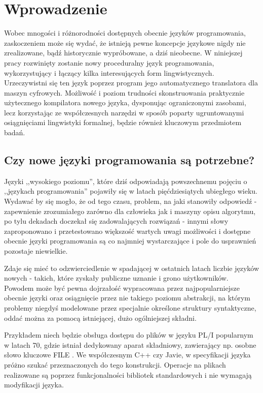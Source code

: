\chapter{Wprowadzenie}
\label{cha:wstep}

Wobec mnogości i różnorodności dostępnych obecnie języków programowania, zaskoczeniem może się wydać, że istnieją pewne koncepcje językowe nigdy nie zrealizowane, bądź historycznie wypróbowane, a dziś nieobecne. W niniejszej pracy rozwinięty zostanie nowy proceduralny język programowania, wykorzystujący i łączący kilka interesujących form lingwistycznych.
Urzeczywistni się ten język poprzez program jego automatycznego translatora dla maszyn cyfrowych. Możliwość i poziom trudności skonstruowania praktycznie użytecznego kompilatora nowego języka, dysponując ograniczonymi zasobami, lecz korzystając ze współczesnych narzędzi w sposób poparty ugruntowanymi osiągnięciami lingwistyki formalnej, będzie również kluczowym przedmiotem badań.


\section{Czy nowe języki programowania są potrzebne?}
Języki ,,wysokiego poziomu'', które dziś odpowiadają powszechnemu pojęciu o ,,językach programowania'' pojawiły się w latach pięćdziesiątych ubiegłego wieku.\cite[s.~13]{DRAGON_BOOK} Wydawać by się mogło, że od tego czasu, problem, na jaki stanowiły odpowiedź - zapewnienie zrozumiałego zarówno dla człowieka jak i maszyny opisu algorytmu, po tylu dekadach doczekał się zadowalających rozwiązań - innymi słowy zaproponowano i przetestowano większość wartych uwagi możliwości i dostępne obecnie języki programowania są co najmniej wystarczające i pole do usprawnień pozostaje niewielkie.

Zdaje się mieć to odzwierciedlenie w spadającej w ostatnich latach liczbie języków nowych - takich, które zyskały publiczne uznanie i grono użytkowników.\cite{valverde2015} Powodem może być pewna dojrzałość wypracowana przez najpopularniejsze obecnie języki oraz osiągnięcie przez nie takiego poziomu abstrakcji, na którym problemy niegdyś modelowane przez specjalnie określone struktury syntaktyczne, oddać można za pomocą istniejącej, dużo ogólniejszej składni.

Przykładem niech będzie obsługa dostępu do plików w języku PL/I popularnym w latach 70, gdzie istniał dedykowany aparat składniowy, zawierający np. osobne słowo kluczowe FILE \cite[s.~96]{plif}. We współczesnym C++ czy Javie, w specyfikacji języka próżno szukać przeznaczonych do tego konstrukcji. Operacje na plikach realizowane są poprzez funkcjonalności bibliotek standardowych i nie wymagają modyfikacji języka.

